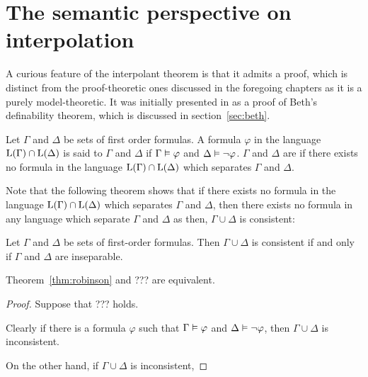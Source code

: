 
\chapter{The semantic perspective on interpolation}

A curious feature of the interpolant theorem is that it admits a proof, which is distinct from the proof-theoretic ones discussed in the foregoing chapters as it is a purely model-theoretic.
It was initially presented in \cite{robinson1956result} as a proof of Beth's definability theorem, which is discussed in section~\ref{sec:beth}.

\begin{defi}[Separability]
	Let $\Gamma$ and $\Delta$ be sets of first order formulas.
	A formula $\varphi$ in the language $\operatorname{L}(\Gamma)\cap \operatorname{L}(\Delta)$ is said to  $\Gamma$ and $\Delta$ if $\Gamma \vDash \varphi$ and $\Delta \vDash \lnot \varphi$.
	$\Gamma$ and $\Delta$ are  if there exists no formula in the language $\operatorname{L}(\Gamma)\cap \operatorname{L}(\Delta)$ which separates $\Gamma$ and $\Delta$.
\end{defi}

Note that the following theorem shows that if there exists no formula in the language $\operatorname{L}(\Gamma)\cap \operatorname{L}(\Delta)$ which separates $\Gamma$ and $\Delta$, then there exists no formula in any language which separate $\Gamma$ and $\Delta$ as then, $\Gamma \cup \Delta$ is consistent:

\begin{thm}
	\label{thm:robinson}
	Let $\Gamma$ and $\Delta$ be sets of first-order formulas.
	Then $\Gamma \cup \Delta$ is consistent if and only if $\Gamma$ and $\Delta$ are inseparable.
\end{thm}


\begin{prop}
	Theorem~\ref{thm:robinson} and ??? are equivalent.
\end{prop}
\begin{proof}
	Suppose that ??? holds.

	Clearly if there is a formula $\varphi$ such that $\Gamma\vDash \varphi$ and $\Delta\vDash \lnot \varphi$, then $\Gamma \cup \Delta $ is inconsistent.

	On the other hand, if $\Gamma\cup\Delta$ is inconsistent, 


\end{proof}

